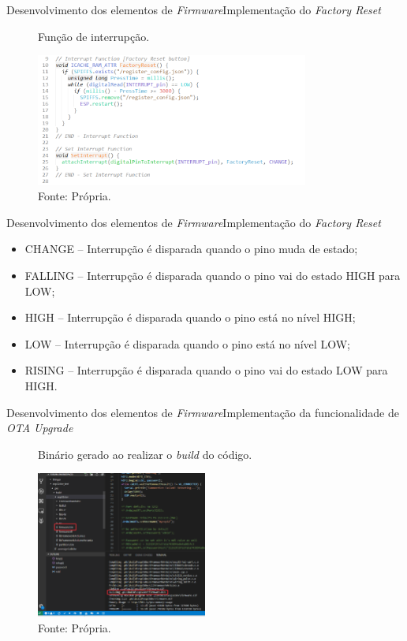 \begin{frame}{Desenvolvimento dos elementos de \textit{Firmware}}{Implementação do \textit{Factory Reset}}
  \begin{figure}[H]
    \centering
    \caption{Função de interrupção.}
    \includegraphics[width=0.8\textwidth]{figuras/interrupcao.png}
    \caption*{\tiny{Fonte: Própria.}}
    \label{fig:interrupcao}
  \end{figure}
\end{frame}

\begin{frame}{Desenvolvimento dos elementos de \textit{Firmware}}{Implementação do \textit{Factory Reset}}
  \begin{itemize}
    \item CHANGE – Interrupção é disparada quando o pino muda de estado;
    \item FALLING – Interrupção é disparada quando o pino vai do estado HIGH para LOW;
    \item HIGH – Interrupção é disparada quando o pino está no nível HIGH;
    \item LOW – Interrupção é disparada quando o pino está no nível LOW;
    \item RISING – Interrupção é disparada quando o pino vai do estado LOW para HIGH.
  \end{itemize}
\end{frame}

\begin{frame}{Desenvolvimento dos elementos de \textit{Firmware}}{Implementação da funcionalidade de \textit{OTA Upgrade}}
  \begin{figure}[H]
    \centering
    \caption{Binário gerado ao realizar o \textit{build} do código.}
    \includegraphics[width=0.5\textwidth]{figuras/platformio_bin.png}
    \caption*{\tiny{Fonte: Própria.}}
    \label{fig:bin}
  \end{figure}
  
\end{frame}


